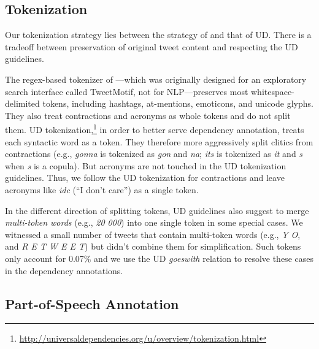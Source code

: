 \documentclass[11pt,a4paper]{article}
\newcommand{\yjcomment}[1]{\textcolor{orange}{[$_\mathrm{L}^\mathrm{Y}$#1]}}
\newcommand{\nascomment}[1]{\textcolor{blue}{[#1 ---\textsc{nas}]}}
\newcommand{\yicomment}[1]{\textcolor{gray}{[#1 ---\textsc{yi}]}}
\begin{document}
\subsection{Tokenization}\label{sec:tok-anno}
Our tokenization strategy lies between the strategy of
\citet{ICWSM101540} and that of UD.
There is a tradeoff between preservation of original tweet content and respecting
the UD guidelines.

The regex-based tokenizer of \citet{ICWSM101540}---which was 
originally designed for an exploratory search interface called
TweetMotif, not for NLP---preserves most whitespace-delimited tokens, including 
hashtags, at-mentions, emoticons, and unicode glyphs. 
They also treat contractions and acronyms as whole tokens and do not split them.
UD
tokenization,\footnote{\url{http://universaldependencies.org/u/overview/tokenization.html}}
in order to better serve dependency annotation, treats each syntactic word as a token.
They therefore more aggressively split
clitics from contractions (e.g., {\it  gonna} is tokenized as {\it gon} and {\it na}; {\it its}
is tokenized as {\it it} and {\it s} when {\it s} is a copula).
But acronyms are not touched
in the UD tokenization guidelines. Thus, we follow the UD tokenization for contractions
and leave acronyms like {\em idc} (``I don't care'') as a single token. 

In the different direction of splitting tokens, UD guidelines also suggest to merge
{\it multi-token words} (e.g., {\it 20 000}) into one single token in some special
cases. We witnessed a small number of tweets that contain multi-token words
(e.g., {\it Y O}, and {\it R E T W E E T}) but didn't combine them for simplification.
Such tokens only account for 0.07\% and we use the UD
  {\it goeswith} relation to resolve these cases in the dependency annotations.

\subsection{Part-of-Speech Annotation}\label{sec:pos-anno}
\end{document}
